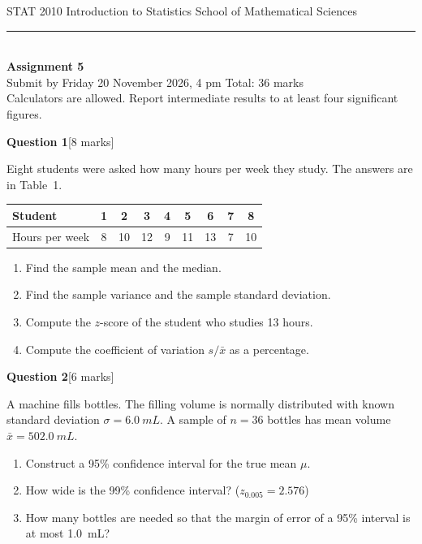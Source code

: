 \documentclass[11pt,a4paper]{article}
\newcommand{\question}[2]{\bigskip\par\noindent\textbf{Question #1}\hfill[#2 marks]\par\nopagebreak\smallskip}
\begin{document}
{\small STAT 2010 \textperiodcentered{} Introduction to Statistics \hfill School of Mathematical Sciences}\\[-0.4em]
\rule{\linewidth}{0.6pt}\\[0.5em]
{\Large\bfseries Assignment 5}\\[0.4em]
Submit by Friday 20 November 2026, 4 pm \hfill Total: 36 marks\\[0.3em]
{\small Calculators are allowed. Report intermediate results to at least four significant figures.}

\question{1}{8}
Eight students were asked how many hours per week they study. The answers are in Table~1.

\begin{center}
\begin{tabular}{lcccccccc}
\toprule
Student & 1 & 2 & 3 & 4 & 5 & 6 & 7 & 8 \\
\midrule
Hours per week & 8 & 10 & 12 & 9 & 11 & 13 & 7 & 10 \\
\bottomrule
\end{tabular}
\end{center}
\begin{enumerate}
  \item Find the sample mean and the median.
  \item Find the sample variance and the sample standard deviation.
  \item Compute the $z$-score of the student who studies 13 hours.
  \item Compute the coefficient of variation $s/\bar{x}$ as a percentage.
\end{enumerate}

\question{2}{6}
A machine fills bottles. The filling volume is normally distributed with known standard deviation
$\sigma = \qty{6.0}{mL}$. A sample of $n = 36$ bottles has mean volume $\bar{x} = \qty{502.0}{mL}$.
\begin{enumerate}
  \item Construct a 95\% confidence interval for the true mean $\mu$.
  \item How wide is the 99\% confidence interval? ($z_{0.005} = 2.576$)
  \item How many bottles are needed so that the margin of error of a 95\% interval is at most
        \qty{1.0}{mL}?
\end{enumerate}
\end{document}
